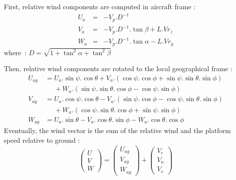 First, relative wind components are computed in
aircraft frame :
\begin{eqnarray*}
U_a & = & - V_p.D^{-1} \\
V_a & = & - V_p.D^{-1}.\tan\beta + L.Vr_z\\
W_a & = & - V_p.D^{-1}.\tan\alpha - L.Vr_y
\end{eqnarray*}
where~: $ D = \sqrt{1+\tan^2\alpha+\tan^2\beta}$

Then, relative wind components are rotated
to the local geographical frame :
\newcommand\relphantom[1]{\mathrel{\phantom{#1}}}
\begin{equation*}\begin{split}
U_{ag} &= U_a.\sin\psi.\cos\theta +  
          V_a.(\cos\psi.\cos\phi + \sin\psi.\sin\theta.\sin\phi) \\
      &\relphantom{=} +  W_a.(\sin\psi.\sin\theta.\cos\phi - \cos\psi.\sin\phi) \\   
V_{ag} &= U_a.\cos\psi.\cos\theta - 
          V_a.(\sin\psi.\cos\phi - \cos\psi.\sin\theta.\sin\phi) \\
      &\relphantom{=}  + W_a.(\cos\psi.\sin\theta.\cos\phi + \sin\psi.\sin\phi) \\
W_{ag} &= U_a.\sin\theta - 
          V_a.\cos\theta.\sin\phi -
          W_a.\cos\theta.\cos\phi
\end{split}\end{equation*}
Eventually, the wind vector is the sum of the relative wind
and the platform speed relative to ground :
\begin{equation*}
\begin{pmatrix}U \\ V \\ W  \end{pmatrix} = 
\begin{pmatrix}U_{ag} \\ V_{ag} \\  W_{ag} \end{pmatrix} + 
\begin{pmatrix} V_e \\ V_n \\ V_v  \end{pmatrix}
\end{equation*}
